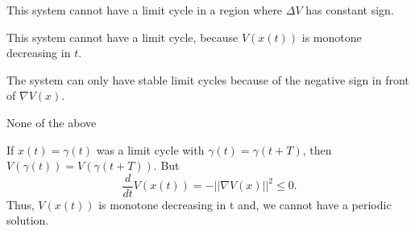 \documentclass[twoside,10pt,a4paper]{article}
\begin{document}
\begin{enumerate}[label=(\alph*)]
	\item This system cannot have a limit cycle in a region where $\Delta V$ has constant sign.
	{\color{MyRed}\item This system cannot have a limit cycle, because $ V(x(t)) $ is monotone decreasing in $t$.}
	\item The system can only have stable limit cycles because of the negative sign in front of $\nabla V(x)$.
	\item None of the above
\end{enumerate}

{\color{MyRed}
	If $x(t) = \gamma(t)$ was a limit cycle with $\gamma(t) = \gamma(t + T)$, then $V(\gamma(t)) = V(\gamma(t + T))$. But
	\begin{equation*}
		\frac{d}{dt} V(x(t)) = - ||\nabla V(x) ||^2 \leq 0.
	\end{equation*}
	Thus, $V(x(t))$ is monotone decreasing in t and, we cannot have a periodic solution.
}
\end{document}
